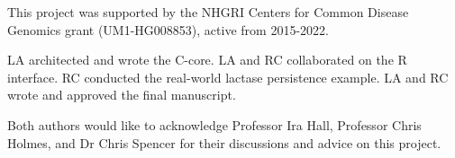 \documentclass[pdflatex,referee,lineno,sn-nature]{sn-jnl}%
\begin{document}

This project was supported by the NHGRI Centers for Common Disease Genomics grant (UM1-HG008853), active from 2015-2022.


LA architected and wrote the C-core.
LA and RC collaborated on the R interface.
RC conducted the real-world lactase persistence example.
LA and RC wrote and approved the final manuscript.


Both authors would like to acknowledge Professor Ira Hall, Professor Chris Holmes, and Dr Chris Spencer for their discussions and advice on this project.



\end{document}

